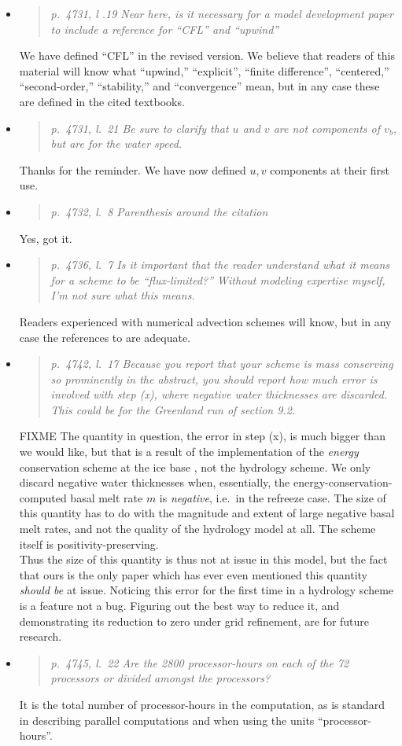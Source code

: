 \documentclass[11pt,reqno]{amsart}
\newcommand{\reply}[2]{
\medskip\medskip
\item  \begin{quote}
\emph{#1}
\end{quote}

\medskip
\noindent #2}
\begin{document}
\begin{itemize}
\reply{p.~4731, l .19 Near here, is it necessary for a model development paper to include a
reference for ``CFL'' and ``upwind''}
{We have defined ``CFL'' in the revised version.  We believe that readers of this material will know what ``upwind,'' ``explicit'', ``finite difference'', ``centered,'' ``second-order,'' ``stability,'' and ``convergence'' mean, but in any case these are defined in the cited textbooks.}

\reply{p.~4731, l.~21 Be sure to clarify that $u$ and $v$ are not components of $v_b$, but are for the water speed.}
{Thanks for the reminder.  We have now defined $u,v$ components at their first use.}

\reply{p.~4732, l.~8 Parenthesis around the citation}
{Yes, got it.}

\reply{p.~4736, l.~7 Is it important that the reader understand what it means for a scheme to be ``flux-limited?''  Without modeling expertise myself, I’m not sure what this means.}
{Readers experienced with numerical advection schemes will know, but in any case the references to \cite{HundsdorferVerwer2010,LeVeque,MortonMayers} are adequate.}

\reply{p.~4742, l.~17 Because you report that your scheme is mass conserving so prominently
in the abstract, you should report how much error is involved with step (x), where
negative water thicknesses are discarded. This could be for the Greenland run of
section 9.2.}
{FIXME The quantity in question, the error in step (x), is much bigger than we would like, but that is a result of the implementation of the \emph{energy} conservation scheme at the ice base \cite{AschwandenBuelerKhroulevBlatter}, not the hydrology scheme.  We only discard negative water thicknesses when, essentially, the energy-conservation-computed basal melt rate $m$ is \emph{negative}, i.e.~in the refreeze case.  The size of this quantity has to do with the magnitude and extent of large negative basal melt rates, and not the quality of the hydrology model at all.  The scheme itself is positivity-preserving. \\
\indent Thus the size of this quantity is thus not at issue in this model, but the fact that ours is the only paper which has ever even mentioned this quantity \emph{should be} at issue.  Noticing this error for the first time in a hydrology scheme is a feature not a bug.  Figuring out the best way to reduce it, and demonstrating its reduction to zero under grid refinement, are for future research.}

\reply{p.~4745, l.~22 Are the 2800 processor-hours on each of the 72 processors or divided amongst the processors?}
{It is the total number of processor-hours in the computation, as is standard in describing parallel computations and when using the units ``processor-hours''.}


\end{itemize}
\end{document}

